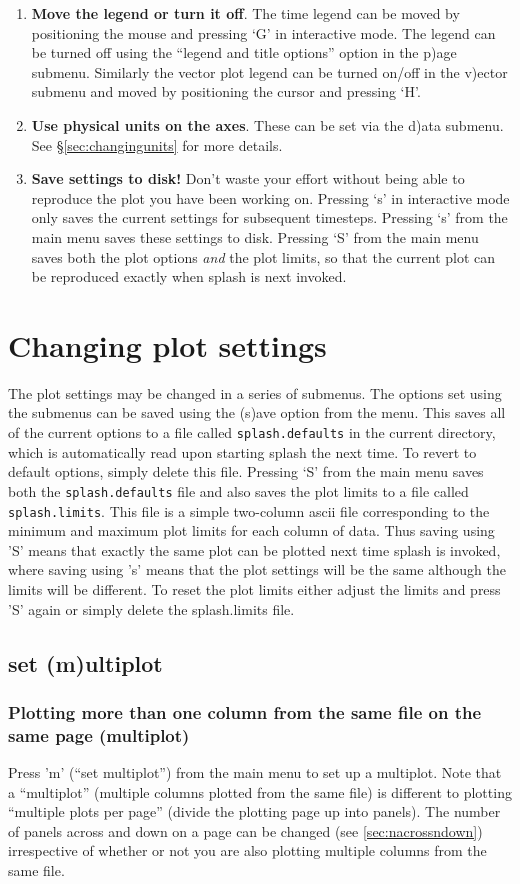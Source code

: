 \documentclass[a4paper,11pt]{article}
\begin{document}
\begin{enumerate}
\item {\bf Move the legend or turn it off}. The time legend can be moved by positioning the mouse and pressing `G' in interactive mode. The legend can be turned off using the ``legend and title options'' option in the p)age submenu. Similarly the vector plot legend can be turned on/off in the v)ector submenu and moved by positioning the cursor and pressing `H'.
\item {\bf Use physical units on the axes}. These can be set via the d)ata submenu. See \S\ref{sec:changingunits} for more details.
\item {\bf Save settings to disk!} Don't waste your effort without being able to reproduce the plot you have been working on. Pressing `s' in interactive mode only saves the current settings for subsequent timesteps. Pressing `s' from the main menu saves these settings to disk. Pressing `S' from the main menu saves both the plot options \emph{and} the plot limits, so that the current plot can be reproduced exactly when splash is next invoked.
\end{enumerate}

\section{Changing plot settings}
 The plot settings may be changed in a series of submenus. The options set using
the submenus can be saved using the (s)ave option from the menu. This saves all of
the current options to a file called \verb+splash.defaults+ in the current directory, which is
automatically read upon starting splash the next time. To revert to default options, simply delete this file.
Pressing `S' from the main menu saves both the \verb+splash.defaults+ file and also saves the plot limits to a file called \verb+splash.limits+. This file is a simple two-column ascii file corresponding to the minimum and maximum plot limits for each column of data. Thus saving using 'S' means that exactly the same plot can be plotted next time splash is invoked, where saving using 's' means that the plot settings will be the same although the limits will be different. To reset the plot limits either adjust the limits and press 'S' again or simply delete the splash.limits file.

\subsection{set (m)ultiplot}
\label{sec:multiplot}
\subsubsection{ Plotting more than one column from the same file on the same page (multiplot)}
 Press 'm'  (``set multiplot'') from the main menu to set up a multiplot. Note that a ``multiplot'' (multiple columns plotted from the same file) is different to plotting ``multiple plots per page'' (divide the plotting page up into panels). The number of panels across and down on a page can be changed (see \ref{sec:nacrossndown}) irrespective of whether or not you are also plotting multiple columns from the same file.
\end{document}

